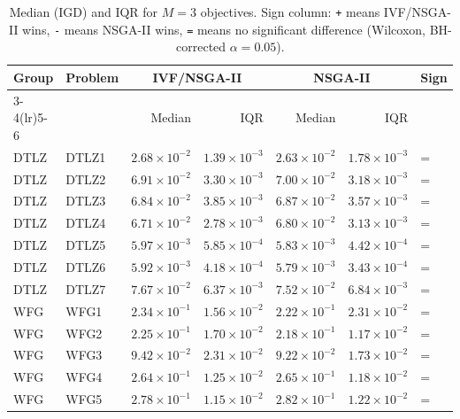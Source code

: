 \begin{table}[t]
\centering
\caption{Median (IGD) and IQR for $M=3$ objectives. Sign column: \texttt{+} means IVF/NSGA-II wins, \texttt{-} means NSGA-II wins, \texttt{=} means no significant difference (Wilcoxon, BH-corrected $\alpha=0.05$).}
\label{tab:igd_m3_ivfnsgaii}
\scriptsize
\begin{tabular}{llrrrrl}
\toprule
Group & Problem & \multicolumn{2}{c}{IVF/NSGA-II} & \multicolumn{2}{c}{NSGA-II} & Sign \\
\cmidrule(lr){3-4}\cmidrule(lr){5-6}
 & & Median & IQR & Median & IQR & \\
\midrule
DTLZ & DTLZ1 & $2.68\!\times\!10^{-2}$ & $1.39\!\times\!10^{-3}$ & $2.63\!\times\!10^{-2}$ & $1.78\!\times\!10^{-3}$ & = \\
DTLZ & DTLZ2 & $6.91\!\times\!10^{-2}$ & $3.30\!\times\!10^{-3}$ & $7.00\!\times\!10^{-2}$ & $3.18\!\times\!10^{-3}$ & = \\
DTLZ & DTLZ3 & $6.84\!\times\!10^{-2}$ & $3.85\!\times\!10^{-3}$ & $6.87\!\times\!10^{-2}$ & $3.57\!\times\!10^{-3}$ & = \\
DTLZ & DTLZ4 & $6.71\!\times\!10^{-2}$ & $2.78\!\times\!10^{-3}$ & $6.80\!\times\!10^{-2}$ & $3.13\!\times\!10^{-3}$ & = \\
DTLZ & DTLZ5 & $5.97\!\times\!10^{-3}$ & $5.85\!\times\!10^{-4}$ & $5.83\!\times\!10^{-3}$ & $4.42\!\times\!10^{-4}$ & = \\
DTLZ & DTLZ6 & $5.92\!\times\!10^{-3}$ & $4.18\!\times\!10^{-4}$ & $5.79\!\times\!10^{-3}$ & $3.43\!\times\!10^{-4}$ & = \\
DTLZ & DTLZ7 & $7.67\!\times\!10^{-2}$ & $6.37\!\times\!10^{-3}$ & $7.52\!\times\!10^{-2}$ & $6.84\!\times\!10^{-3}$ & = \\
\addlinespace
WFG & WFG1 & $2.34\!\times\!10^{-1}$ & $1.56\!\times\!10^{-2}$ & $2.22\!\times\!10^{-1}$ & $2.31\!\times\!10^{-2}$ & = \\
WFG & WFG2 & $2.25\!\times\!10^{-1}$ & $1.70\!\times\!10^{-2}$ & $2.18\!\times\!10^{-1}$ & $1.17\!\times\!10^{-2}$ & = \\
WFG & WFG3 & $9.42\!\times\!10^{-2}$ & $2.31\!\times\!10^{-2}$ & $9.22\!\times\!10^{-2}$ & $1.73\!\times\!10^{-2}$ & = \\
WFG & WFG4 & $2.64\!\times\!10^{-1}$ & $1.25\!\times\!10^{-2}$ & $2.65\!\times\!10^{-1}$ & $1.18\!\times\!10^{-2}$ & = \\
WFG & WFG5 & $2.78\!\times\!10^{-1}$ & $1.15\!\times\!10^{-2}$ & $2.82\!\times\!10^{-1}$ & $1.22\!\times\!10^{-2}$ & = \\

\end{tabular}
\end{table}
